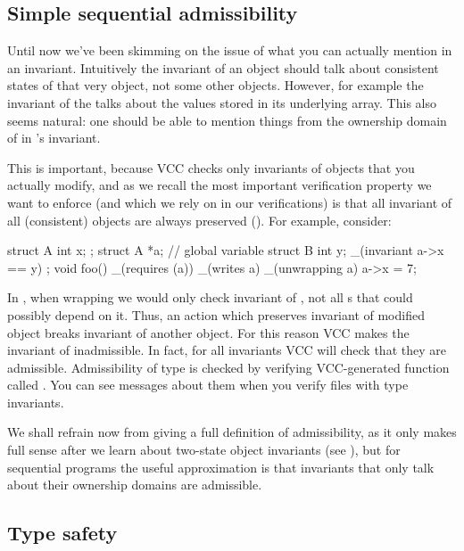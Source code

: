 \subsection{Simple sequential admissibility}
\label{sect:admissibility0}

Until now we've been skimming on the issue of what you can actually
mention in an invariant. 
Intuitively the invariant of an object should talk about consistent states
of that very object, not some other objects.
However, for example the invariant of the  
talks about the values stored in its underlying array.
This also seems natural: one should be able to mention things
from the ownership domain of  in 's invariant.

This is important, because VCC checks only invariants of objects
that you actually modify, and as we recall the most important
verification property we want to enforce (and which we rely on in our
verifications) is that all invariant of all (consistent) objects 
are always preserved ().
For example, consider:

\begin{VCC}
struct A { int x; };
struct A *a; // global variable
struct B {
  int y;
  _(invariant a->x == y)
};
void foo()
  _(requires \wrapped(a))
  _(writes a)
{
  _(unwrapping a) { a->x = 7; }
}
\end{VCC}

\noindent
In , when wrapping  we would only check invariant
of , not all s that could possibly depend on it.
Thus, an action which preserves invariant of modified object breaks invariant of another object.
For this reason VCC makes the invariant of  inadmissible.
In fact, for all invariants VCC will check that they are admissible.
Admissibility of type  is checked by verifying VCC-generated
function called .
You can see messages about them when you verify files with type
invariants.

We shall refrain now from giving a full definition of admissibility, as 
it only makes full sense after we learn about two-state object invariants
(see ), but for sequential programs the useful approximation
is that invariants that only talk about their ownership domains are admissible.


\subsection{Type safety}
\label{sect:type-safety}

